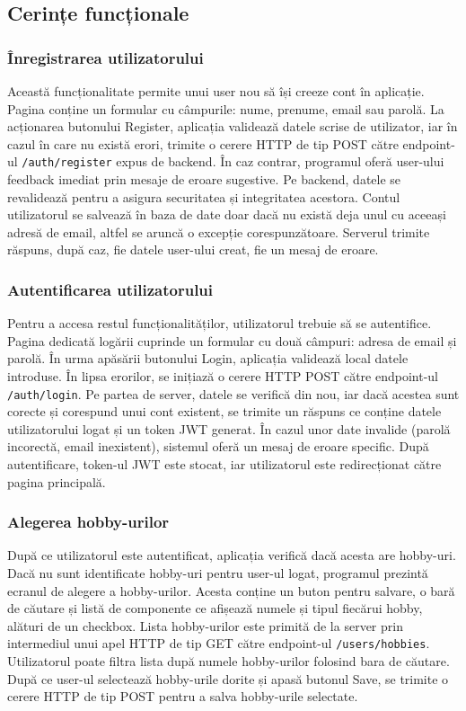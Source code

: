 \subsection{Cerințe funcționale}
\label{subsec:ch4sec2sub1}

\subsubsection*{Înregistrarea utilizatorului}
Această funcționalitate permite unui user nou să își creeze cont în aplicație. Pagina conține un formular cu câmpurile: nume, prenume, email sau parolă.
La acționarea butonului Register, aplicația validează datele scrise de utilizator, iar în cazul în care
nu există erori, trimite o cerere HTTP de tip POST către endpoint-ul \texttt{/auth/register} expus de backend. În caz contrar, programul oferă user-ului feedback imediat prin mesaje de eroare sugestive.
Pe backend, datele se revalidează pentru a asigura securitatea și integritatea acestora. 
Contul utilizatorul se salvează în baza de date doar dacă nu există deja unul cu aceeași adresă de email, altfel se aruncă o excepție corespunzătoare.
Serverul trimite răspuns, după caz, fie datele user-ului creat, fie un mesaj de eroare.

\subsubsection*{Autentificarea utilizatorului}
Pentru a accesa restul funcționalităților, utilizatorul trebuie să se autentifice. Pagina dedicată logării cuprinde un formular cu două câmpuri: adresa de email și parolă.
În urma apăsării butonului Login, aplicația validează local datele introduse. În lipsa erorilor, se inițiază o cerere HTTP POST către endpoint-ul \texttt{/auth/login}.
Pe partea de server, datele se verifică din nou, iar dacă acestea sunt corecte și corespund unui cont existent, se trimite un răspuns ce conține datele utilizatorului logat și un token JWT generat.
În cazul unor date invalide (parolă incorectă, email inexistent), sistemul oferă un mesaj de eroare specific. După autentificare, token-ul JWT este stocat, iar utilizatorul este redirecționat către pagina principală.


\subsubsection*{Alegerea hobby-urilor}
După ce utilizatorul este autentificat, aplicația verifică dacă acesta are hobby-uri. Dacă nu sunt identificate hobby-uri pentru user-ul logat, programul prezintă
ecranul de alegere a hobby-urilor. Acesta conține un buton pentru salvare, o bară de căutare și listă de componente ce afișează numele și tipul fiecărui hobby, alături de un checkbox.
Lista hobby-urilor este primită de la server prin intermediul unui apel HTTP de tip GET către endpoint-ul \texttt{/users/hobbies}. 
Utilizatorul poate filtra lista după numele hobby-urilor folosind bara de căutare. 
După ce user-ul selectează hobby-urile dorite și apasă butonul Save, se trimite o cerere HTTP de tip POST pentru a salva hobby-urile selectate.


